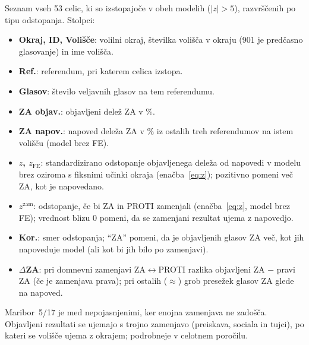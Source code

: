 \documentclass[11pt,a4paper]{article}
\begin{document}
Seznam vseh 53 celic, ki so izstopajoče v obeh modelih ($|z|>5$), razvrščenih po tipu odstopanja. Stolpci:
\begin{itemize}\setlength{\itemsep}{0pt}
\item \textbf{Okraj, ID, Volišče}: volilni okraj, številka volišča v okraju (901 je predčasno glasovanje) in ime volišča.
\item \textbf{Ref.}: referendum, pri katerem celica izstopa.
\item \textbf{Glasov}: število veljavnih glasov na tem referendumu.
\item \textbf{ZA objav.}: objavljeni delež ZA v \%.
\item \textbf{ZA napov.}: napoved deleža ZA v \% iz ostalih treh referendumov na istem volišču (model brez FE).
\item \textbf{$z$, $z_{\text{FE}}$}: standardizirano odstopanje objavljenega deleža od napovedi v modelu brez oziroma s fiksnimi učinki okraja (enačba~\ref{eq:z}); pozitivno pomeni več ZA, kot je napovedano.
\item \textbf{$z^{\text{zam}}$}: odstopanje, če bi ZA in PROTI zamenjali (enačba~\ref{eq:z}, model brez FE); vrednost blizu 0 pomeni, da se zamenjani rezultat ujema z napovedjo.
\item \textbf{Kor.}: smer odstopanja; ``ZA'' pomeni, da je objavljenih glasov ZA več, kot jih napoveduje model (ali kot bi jih bilo po zamenjavi).
\item \textbf{$\Delta$ZA}: pri domnevni zamenjavi ZA$\leftrightarrow$PROTI razlika objavljeni ZA $-$ pravi ZA (če je zamenjava prava); pri ostalih ($\approx$) grob presežek glasov ZA glede na napoved.
\end{itemize}
Maribor~5/17 je med nepojasnjenimi, ker enojna zamenjava ne zadošča. Objavljeni rezultati se ujemajo s trojno zamenjavo (preiskava, sociala in tujci), po kateri se volišče ujema z okrajem; podrobneje v celotnem poročilu.
\end{document}
